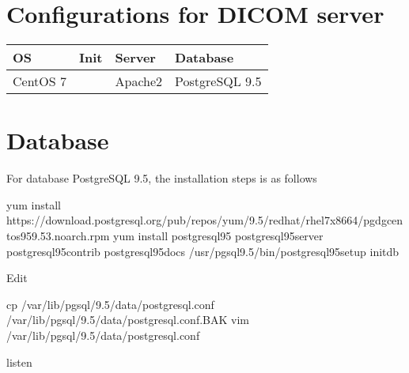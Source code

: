 \documentclass[letterpaper,10pt,english]{sphinxmanual}
\begin{document}
\section{Configurations for DICOM server}
\label{\detokenize{trl2:configurations-for-dicom-server}}

\begin{savenotes}\sphinxattablestart
\centering
\begin{tabulary}{\linewidth}[t]{|T|T|T|T|}
\hline
\sphinxstyletheadfamily 
OS
&\sphinxstyletheadfamily 
Init
&\sphinxstyletheadfamily 
Server
&\sphinxstyletheadfamily 
Database
\\
\hline
CentOS 7
&
&
Apache2
&
PostgreSQL 9.5
\\
\hline
\end{tabulary}
\par
\sphinxattableend\end{savenotes}


\section{Database}
\label{\detokenize{trl2:database}}
For database PostgreSQL 9.5, the installation steps is as follows

%
\begin{sphinxVerbatim}[commandchars=\\\{\}]
yum install https://download.postgresql.org/pub/repos/yum/9.5/redhat/rhel\PYGZhy{}7\PYGZhy{}x86\PYGZus{}64/pgdg\PYGZhy{}centos95\PYGZhy{}9.5\PYGZhy{}3.noarch.rpm
yum install postgresql95 postgresql95\PYGZhy{}server postgresql95\PYGZhy{}contrib postgresql95\PYGZhy{}docs
/usr/pgsql\PYGZhy{}9.5/bin/postgresql95\PYGZhy{}setup initdb
\end{sphinxVerbatim}

Edit 

%
\begin{sphinxVerbatim}[commandchars=\\\{\}]
cp /var/lib/pgsql/9.5/data/postgresql.conf /var/lib/pgsql/9.5/data/postgresql.conf.BAK
vim /var/lib/pgsql/9.5/data/postgresql.conf
\end{sphinxVerbatim}

%
\begin{sphinxVerbatim}[commandchars=\\\{\}]
listen   
  
\end{sphinxVerbatim}
\end{document}
